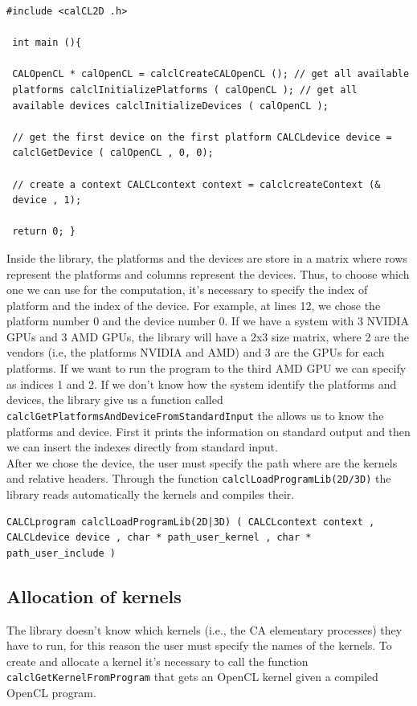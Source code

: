 \begin{lstlisting}
#include <calCL2D .h>

 int main (){

 CALOpenCL * calOpenCL = calclCreateCALOpenCL (); // get all available
 platforms calclInitializePlatforms ( calOpenCL ); // get all
 available devices calclInitializeDevices ( calOpenCL );

 // get the first device on the first platform CALCLdevice device =
 calclGetDevice ( calOpenCL , 0, 0);

 // create a context CALCLcontext context = calclcreateContext (&
 device , 1);

 return 0; }
\end{lstlisting}

Inside the library, the platforms and the devices are store in a
matrix where rows represent the platforms and columns represent the
devices. Thus, to choose which one we can use for the computation,
it's necessary to specify the index of platform and the index of the
device. For example, at lines 12, we chose the platform number 0 and
the device number 0. If we have a system with 3 NVIDIA GPUs and 3 AMD
GPUs, the library will have a 2x3 size matrix, where 2 are the vendors
(i.e, the platforms NVIDIA and AMD) and 3 are the GPUs for each
platforms. If we want to run the program to the third AMD GPU we can
specify as indices 1 and 2.  If we don't know how the system identify
the platforms and devices, the library give us a function called
\verb'calclGetPlatformsAndDeviceFromStandardInput' the allows us to
know the platforms and device. First it prints the information on
standard output and then we can insert the indexes directly from
standard input.\\ After we chose the device, the user must specify the
path where are the kernels and relative headers.  Through the function
\verb'calclLoadProgramLib(2D/3D)' the library reads automatically the
kernels and compiles their.
\begin{lstlisting}
CALCLprogram calclLoadProgramLib(2D|3D) ( CALCLcontext context ,
CALCLdevice device , char * path_user_kernel , char *
path_user_include )
\end{lstlisting}

\subsection{Allocation of kernels}

The library doesn't know which kernels (i.e., the CA elementary
processes) they have to run, for this reason the user must specify the
names of the kernels.  To create and allocate a kernel it's necessary
to call the function \verb'calclGetKernelFromProgram' that gets an
OpenCL kernel given a compiled OpenCL program.

